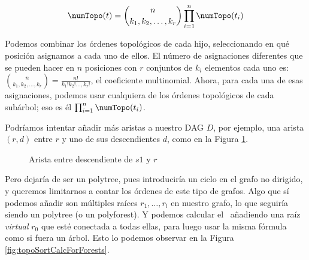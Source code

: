 $$\numTopo(t) =  \binom{n}{k_1, k_2, \ldots, k_r} \prod_{i=1}^{n} \numTopo(t_i)$$

Podemos combinar los órdenes topológicos de cada hijo, seleccionando en qué posición asignamos a cada uno de ellos. El número de asignaciones diferentes que se pueden hacer en $n$ posiciones con $r$ conjuntos de $k_i$ elementos cada uno es: $ \binom{n}{k_1, k_2, \ldots, k_r}= \frac{n!}{k_1! k_2! \ldots, k_r!}$, el coeficiente multinomial. Ahora, para cada una de esas asignaciones, podemos usar cualquiera de los órdenes topológicos de cada subárbol; eso es él $\prod_{i=1}^{n} \numTopo(t_i)$.

Podríamos intentar añadir más aristas a nuestro DAG $D$, por ejemplo, una arista $(r,d)$ entre $r$ y uno de sus descendientes $d$, como en la Figura \ref{fig:notPolytreeExample}.

\begin{figure}[ht]
\centering 
    \caption{Arista entre descendiente de $s1$ y $r$}
    \label{fig:notPolytreeExample}
\end{figure}

Pero dejaría de ser un polytree, pues introduciría un ciclo en el grafo no dirigido, y queremos limitarnos a contar los órdenes de este tipo de grafos. Algo que sí podemos añadir son múltiples raíces $r_1, \dots, r_l$ en nuestro grafo, lo que seguiría siendo un polytree (o un polyforest). Y podemos calcular el \numTopo \ añadiendo una raíz \emph{virtual} $r_0$ que esté conectada a todas ellas, para luego usar la misma fórmula como si fuera un árbol. Esto lo podemos observar en la Figura \ref{fig:topoSortCalcForForests}.

